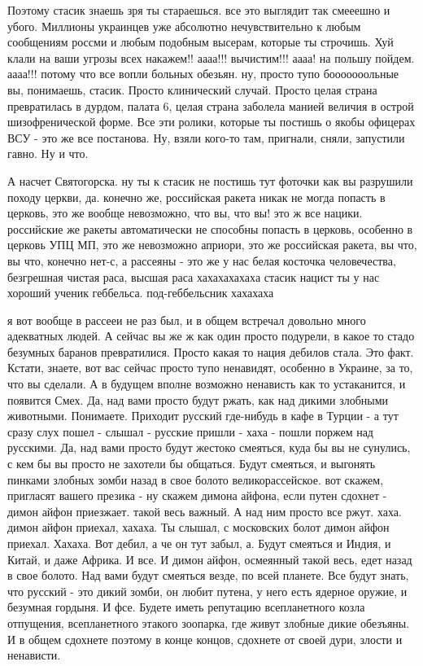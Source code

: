 Поэтому стасик знаешь зря ты стараешься. все это выглядит так смееешно и убого.
Миллионы украинцев уже абсолютно нечувствительно к любым сообщениям россми и
любым подобным высерам, которые ты строчишь. Хуй клали на ваши угрозы всех
накажем!! аааа!!! вычистим!!! аааа! на польшу пойдем. аааа!!! потому что все
вопли больных обезьян. ну, просто тупо бооооооольные вы, понимаешь, стасик.
Просто клинический случай. Просто целая страна превратилась в дурдом, палата 6,
целая страна заболела манией величия в острой шизофренической форме. Все эти
ролики, которые ты постишь о якобы офицерах ВСУ - это же все постанова. Ну,
взяли кого-то там, пригнали, сняли, запустили гавно. Ну и что.

А насчет Святогорска. ну ты к стасик не постишь тут фоточки как вы разрушили
походу церкви, да. конечно же, российская ракета никак не могда попасть в
церковь, это же вообще невозможно, что вы, что вы! это ж все нацики. российские
же ракеты автоматически не способны попасть в церковь, особенно в церковь УПЦ
МП, это же невозможно априори, это же российская ракета, вы что, вы что,
конечно нет-с, а рассеяны - это же у нас белая косточка человечества,
безгрешная чистая раса, высшая раса хахахахахаха стасик нацист ты у нас хороший
ученик геббельса. под-геббельсник хахахаха

я вот вообще в рассееи не раз был, и в общем встречал довольно много адекватных
людей. А сейчас вы же ж как один просто подурели, в какое то стадо безумных
баранов превратилися. Просто какая то нация дебилов стала. Это факт. Кстати,
знаете, вот вас сейчас просто тупо ненавидят, особенно в Украине, за то, что вы
сделали. А в будущем вполне возможно ненависть как то устаканится, и появится
Смех. Да, над вами просто будут ржать, как над дикими злобными животными.
Понимаете. Приходит русский где-нибудь в кафе в Турции - а тут сразу слух пошел
- слышал - русские пришли - хаха - пошли поржем над русскими. Да, над вами
просто будут жестоко смеяться, куда бы вы не сунулись, с кем бы вы просто не
захотели бы общаться. Будут смеяться, и выгонять пинками злобных зомби назад в
свое болото великорассейское. вот скажем, пригласят вашего презика - ну скажем
димона айфона, если путен сдохнет - димон айфон приезжает. такой весь важный. А
над ним просто все ржут. хаха. димон айфон приехал, хахаха. Ты слышал, с
московских болот димон айфон приехал. Хахаха. Вот дебил, а че он тут забыл, а.
Будут смеяться и Индия, и Китай, и даже Африка. И все. И димон айфон, осмеянный
такой весь, едет назад в свое болото. Над вами будут смеяться везде, по всей
планете. Все будут знать, что русский - это дикий зомби, он любит путена, у
него есть ядерное оружие, и безумная гордыня. И фсе. Будете иметь репутацию
всепланетного козла отпущения, всепланетного этакого зоопарка, где живут
злобные дикие обезъяны. И в общем сдохнете поэтому в конце концов, сдохнете от
своей дури, злости и ненависти.

